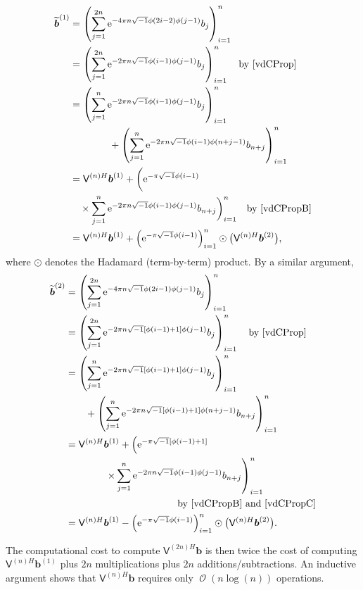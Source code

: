 \documentclass[twocolumn]{svjour3}          %
\DeclareMathOperator{\Order}{{\mathcal O}}
\newcommand{\bm}[1]{\boldsymbol{#1}}
\newcommand{\vb}{\bm{b}}
\newcommand{\mV}{\mathsf{V}}
\newcommand{\me}{\mathrm{e}}
\begin{document}
\begin{align*}
\widetilde{\vb}^{(1)} &= \left( \sum_{j=1}^{2n}  \me^{-4 \pi n \sqrt{-1} \phi(2i-2)\phi(j-1)} b_{j} \right)_{i=1}^n \\
&= \left( \sum_{j=1}^{2n}  \me^{-2 \pi n \sqrt{-1} \phi(i-1)\phi(j-1)} b_{j} \right)_{i=1}^n \quad \text{by \eqref{vdCProp}}\\
&= \left( \sum_{j=1}^{n}  \me^{-2 \pi n \sqrt{-1} \phi(i-1)\phi(j-1)} b_{j} \right)_{i=1}^n \quad \\
&\qquad \qquad +  \left( \sum_{j=1}^{n}  \me^{-2 \pi n \sqrt{-1} \phi(i-1)\phi(n+j-1)} b_{n+j} \right)_{i=1}^n \\
&= \mV^{(n)H}\vb^{(1)}  +  \biggl(  \me^{-\pi \sqrt{-1} \phi(i-1)}  \\
& \quad \times \sum_{j=1}^{n}  \me^{-2 \pi n \sqrt{-1} \phi(i-1)\phi(j-1)} b_{n+j} \biggr)_{i=1}^n \quad  \text{by \eqref{vdCPropB}}\\
&= \mV^{(n)H}\vb^{(1)} +  \left(  \me^{-\pi \sqrt{-1} \phi(i-1)} \right)_{i=1}^n \odot \bigl(\mV^{(n)H}\vb^{(2)} \bigr),
\end{align*}
where $\odot$ denotes the Hadamard (term-by-term) product.  By a similar argument, 
\begin{align*}
\widetilde{\vb}^{(2)} &= \left( \sum_{j=1}^{2n}  \me^{-4 \pi n \sqrt{-1} \phi(2i-1)\phi(j-1)} b_{j} \right)_{i=1}^n \\
&= \left( \sum_{j=1}^{2n}  \me^{-2 \pi n \sqrt{-1} [\phi(i-1)+1]\phi(j-1)} b_{j} \right)_{i=1}^n \quad \text{by \eqref{vdCProp}}\\
&= \left( \sum_{j=1}^{n}  \me^{-2 \pi n \sqrt{-1} [\phi(i-1)+1]\phi(j-1)} b_{j} \right)_{i=1}^n \quad \\
&\qquad  +  \left( \sum_{j=1}^{n}  \me^{-2 \pi n \sqrt{-1} [\phi(i-1)+1]\phi(n+j-1)} b_{n+j} \right)_{i=1}^n \\
&= \mV^{(n)H}\vb^{(1)} 
+  \left(  \me^{ -\pi \sqrt{-1} [\phi(i-1) + 1]} \right. 
\\
& \qquad \qquad \left . \times \sum_{j=1}^{n}  \me^{-2 \pi n \sqrt{-1} \phi(i-1)\phi(j-1)} b_{n+j} \right)_{i=1}^n \\
& \hspace{4cm}  \text{by \eqref{vdCPropB} and \eqref{vdCPropC}}\\
&= \mV^{(n)H}\vb^{(1)} -  \left(  \me^{-\pi \sqrt{-1} \phi(i-1)} \right)_{i=1}^n \odot \bigl(\mV^{(n)H}\vb^{(2)} \bigr).
\end{align*}

The computational cost to compute $\mV^{(2n)H}\vb$ is then twice the cost of computing $\mV^{(n)H}\vb^{(1)}$ plus $2n$ multiplications plus $2n$ additions/subtractions.  An inductive argument shows that $\mV^{(n)H}\vb$ requires only $\Order(n \log(n))$ operations.
\end{document}
